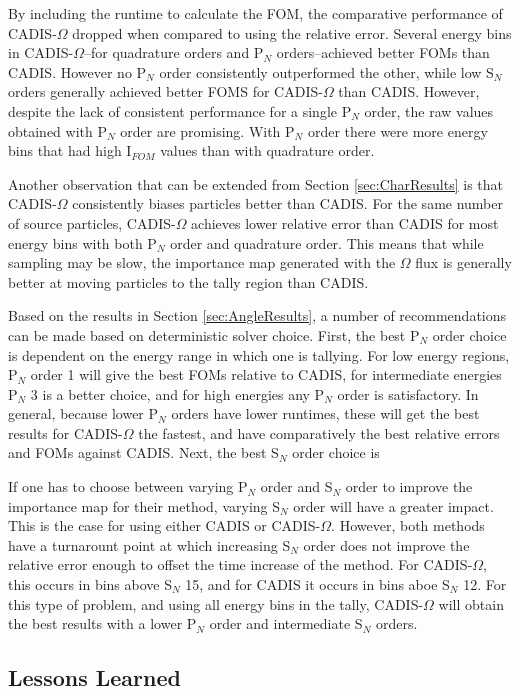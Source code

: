 By including the runtime to calculate
the FOM, the comparative performance of CADIS-$\Omega$ dropped when compared to
using the relative error. Several
energy bins in CADIS-$\Omega$--for quadrature orders and
P$_N$ orders--achieved better FOMs than
CADIS. However no P$_N$ order consistently outperformed the other, while low
S$_N$ orders generally achieved better FOMS for CADIS-$\Omega$ than CADIS.
However, despite the lack of consistent performance for a single P$_N$ order,
the raw values obtained with P$_N$ order are promising. With P$_N$ order
there were more energy bins that had high I$_{FOM}$ values than with quadrature
order.

Another observation that can be extended from Section \ref{sec:CharResults} is
that CADIS-$\Omega$ consistently biases
particles better than CADIS. For the same number of source particles,
CADIS-$\Omega$
achieves lower relative error than CADIS for most energy bins with both P$_N$
order and quadrature order. This means that while sampling may be slow, the
importance map generated with the $\Omega$ flux is generally
better at moving particles to the tally region than
CADIS.

Based on the results in Section \ref{sec:AngleResults}, a number of
recommendations can be made based on deterministic solver choice. First, the
best P$_N$ order choice is
dependent on the energy range in which one is tallying. For low energy regions,
P$_N$ order 1 will give the best FOMs relative to CADIS, for intermediate
energies P$_N$ 3 is a better choice, and for high energies any P$_N$ order is
satisfactory. In general, because lower P$_N$ orders have lower runtimes, these
will get the best results for CADIS-$\Omega$ the fastest, and have comparatively
the best relative errors and FOMs against CADIS. Next, the best S$_N$ order
choice is

If one has to choose between varying P$_N$ order and S$_N$ order to improve the
importance map for their method, varying S$_N$ order will have a greater impact.
This is the case for using either CADIS or CADIS-$\Omega$. However, both methods
have a turnarount point at which increasing S$_N$ order does not improve the
relative error enough to offset the time increase of the method. For
CADIS-$\Omega$, this occurs in bins above S$_N$ 15, and for CADIS it occurs in
bins aboe S$_N$ 12. For this type of problem, and using all energy bins in the
tally, CADIS-$\Omega$ will obtain the
best results with a lower P$_N$ order and intermediate S$_N$ orders.

\subsection{Lessons Learned}
\label{sec:lesslearn}

